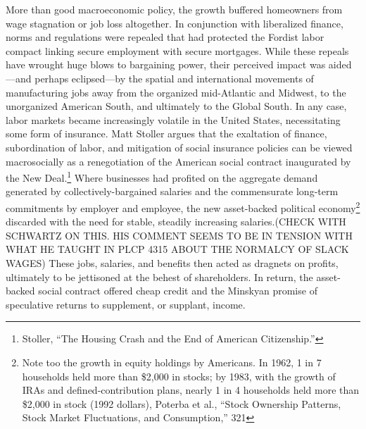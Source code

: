 \documentclass[
]{article}
\begin{document}
More than good macroeconomic policy, the growth buffered homeowners from wage stagnation or job loss altogether.
In conjunction with liberalized finance, norms and regulations were repealed that had protected the Fordist labor compact linking secure employment with secure mortgages.
While these repeals have wrought huge blows to bargaining power, their perceived impact was aided---and perhaps eclipsed---by the spatial and international movements of manufacturing jobs away from the organized mid-Atlantic and Midwest, to the unorganized American South, and ultimately to the Global South.
In any case, labor markets became increasingly volatile in the United States, necessitating some form of insurance.
Matt Stoller argues that the exaltation of finance, subordination of labor, and mitigation of social insurance policies can be viewed macrosocially as a renegotiation of the American social contract inaugurated by the New Deal.\footnote{Stoller, ``The Housing Crash and the End of American Citizenship.''}
Where businesses had profited on the aggregate demand generated by collectively-bargained salaries and the commensurate long-term commitments by employer and employee, the new asset-backed political economy\footnote{Note too the growth in equity holdings by Americans. In 1962, 1 in 7 households held more than \$2,000 in stocks; by 1983, with the growth of IRAs and defined-contribution plans, nearly 1 in 4 households held more than \$2,000 in stock (1992 dollars), Poterba et al., ``Stock Ownership Patterns, Stock Market Fluctuations, and Consumption,'' 321} discarded with the need for stable, steadily increasing salaries.(CHECK WITH SCHWARTZ ON THIS. HIS COMMENT SEEMS TO BE IN TENSION WITH WHAT HE TAUGHT IN PLCP 4315 ABOUT THE NORMALCY OF SLACK WAGES)
These jobs, salaries, and benefits then acted as dragnets on profits, ultimately to be jettisoned at the behest of shareholders.
In return, the asset-backed social contract offered cheap credit and the Minskyan promise of speculative returns to supplement, or supplant, income.
\end{document}
